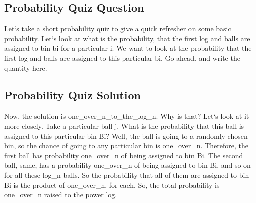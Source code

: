 \subsection{Probability Quiz Question}
Let`s take a short probability quiz to give a quick refresher on some basic probability.
Let`s look at what is the probability, that the first log and balls are assigned to bin bi for a particular i.
We want to look at the probability that the first log and balls are assigned to this particular bi.
Go ahead, and write the quantity here.

\subsection{Probability Quiz Solution}
Now, the solution is one\_over\_n\_to\_the\_log\_n.
Why is that? Let`s look at it more closely.
Take a particular ball j.
What is the probability that this ball is assigned to this particular bin Bi? Well, the ball is going to a randomly chosen bin, so the chance of going to any particular bin is one\_over\_n.
Therefore, the first ball has probability one\_over\_n of being assigned to bin Bi.
The second ball, same, has a probability one\_over\_n of being assigned to bin Bi, and so on for all these log\_n balls.
So the probability that all of them are assigned to bin Bi is the product of one\_over\_n, for each.
So, the total probability is one\_over\_n raised to the power log.

